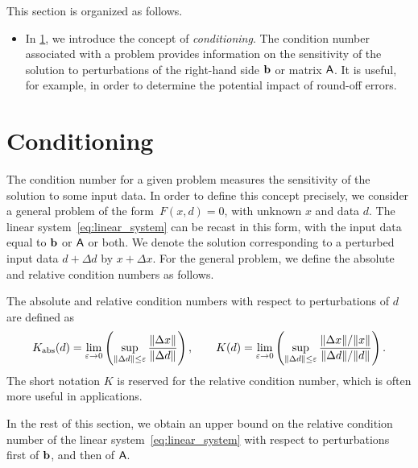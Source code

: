 This section is organized as follows.
\begin{itemize}
    \item
        In \cref{sec:conditioning},
        we introduce the concept of \emph{conditioning}.
        The condition number associated with a problem provides information on the sensitivity of the solution to perturbations of the right-hand side $\mathbf b$ or matrix $\mathsf A$.
        It is useful, for example, in order to determine the potential impact of round-off errors.
\end{itemize}

\section{Conditioning}%
\label{sec:conditioning}

The condition number for a given problem measures the sensitivity of the solution to some input data.
In order to define this concept precisely,
we consider a general problem of the form~$F(x, d) = 0$,
with unknown $x$ and data $d$.
The linear system~\eqref{eq:linear_system} can be recast in this form,
with the input data equal to $\mathbf b$ or $\mathsf A$ or both.
We denote the solution corresponding to a perturbed input data $d + \Delta d$ by $x + \Delta x$.
For the general problem,
we define the absolute and relative condition numbers as follows.

\begin{definition}
    The absolute and relative condition numbers with respect to perturbations of $d$ are defined as
    \[
        K_{\rm abs}(d) = \lim_{\varepsilon \to 0} \left( \sup_{\lVert\Delta d\rVert \leq \varepsilon} \frac{\lVert\Delta x\rVert}{\lVert\Delta d\rVert} \right),
        \qquad
        K(d) = \lim_{\varepsilon \to 0} \left( \sup_{\lVert\Delta d\rVert \leq \varepsilon} \frac{\lVert\Delta x\rVert / \lVert x\rVert}{\lVert\Delta d\rVert / \lVert d\rVert} \right).
    \]
    The short notation $K$ is reserved for the relative condition number,
    which is often more useful in applications.
\end{definition}

In the rest of this section,
we obtain an upper bound on the relative condition number of the linear system~\eqref{eq:linear_system} with respect to perturbations first of $\mathbf b$,
and then of $\mathsf A$.

